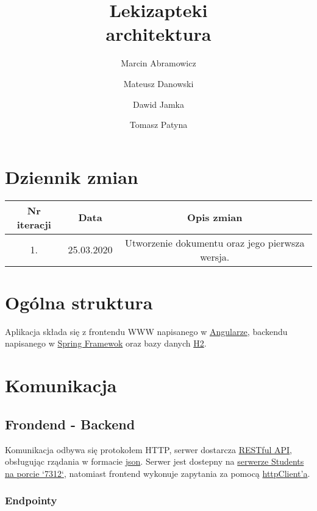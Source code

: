 \documentclass{article}
\title{
Lekizapteki\\
\large architektura}
\author{Marcin Abramowicz \and Mateusz Danowski \and Dawid Jamka \and Tomasz Patyna}
\begin{document}
  \maketitle

  \section{Dziennik zmian}
  \begin{tabular}{|c|c|c|}
    Nr iteracji & Data & Opis zmian \\
    \hline
    1. & 25.03.2020 & Utworzenie dokumentu oraz jego pierwsza wersja. \\
  \end{tabular}

  \section{Ogólna struktura}
  Aplikacja składa się z frontendu WWW napisanego w
  \href{https://angular.io}{Angularze}, backendu napisanego w
  \href{https://spring.io}{Spring Framewok} oraz bazy danych
  \href {https://spring.io}{H2}.

  \section{Komunikacja}
  \subsection{Frondend - Backend}
  Komunikacja odbywa się protokołem HTTP, serwer dostarcza
  \href{https://en.wikipedia.org/wiki/Representational_state_transfer}{RESTful API},
  obsługując rządania w formacie
  \href{https://en.wikipedia.org/wiki/JSON}{json}.
  Serwer jest dostepny na
  \href{http://students.mimuw.edu.pl:7312}{serwerze Students na porcie `7312`},
  natomiast frontend wykonuje zapytania za pomocą
  \href{https://angular.io/guide/http}{httpClient'a}.

  \subsubsection{Endpointy}
\end{document}
